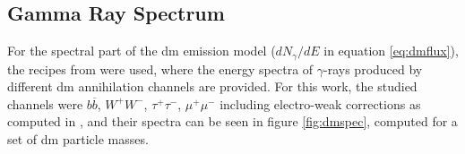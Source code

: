 \documentclass{article}
\begin{document}


\begin{table}
\centering
\addtolength{\tabcolsep}{6pt}
\renewcommand{\arraystretch}{1.1}
\caption{Benchmark \gls{dm} profiles adopted in this work. The {\tt iso-mean} and {\tt nfw-mean} corresponds to the profiles from table II in \cite{Buckley:2015doa} with the same nomenclature. The $\mathcal{J}$ factor, in the last column, is integrated over a field of view of 10$^\rm o$.}
\label{tab:dmprofiles} 
\end{table}


 
 \subsection{Gamma Ray Spectrum}\label{\gls{dm}spectrumAnn}  
 
 For the spectral part of the \gls{dm} emission model ($dN_{\gamma}/dE$ in equation \ref{eq:dmflux}), the recipes from \cite{2011cirelli} were used, where the energy spectra of $\gamma$-rays produced by different \gls{dm} annihilation channels are provided. For this work, the studied channels were $b \overline b$, $W^+ W^-$, $\tau^+\tau^-$, $\mu^+ \mu^-$ including electro-weak corrections as computed in \cite{2011EWcorrections}, and their spectra can be seen in figure \ref{fig:dmspec}, computed for a set of \gls{dm} particle masses.
\end{document}
